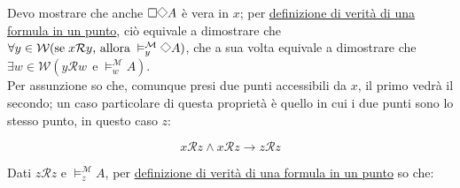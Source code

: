\documentclass[a4paper,12pt]{article}
\newcommand{\Dmd}{\mathord{\vcenter{\hbox{\tikz[baseline=-0.6ex]{\draw[line width=0.4pt, scale=1, rotate=45] (0,0) rectangle (0.2,0.2);}}}}} %
\begin{document}
\begin{dimo}
\begin{enumerate}
\begin{minipage}{0.48\textwidth}
		      \end{minipage}
		      \vspace{8pt}

		      Devo mostrare che anche $\Box \Dmd A$ è vera in $x$; per \hyperlink{defverp}{definizione di verità di una formula in un punto}, ciò equivale a dimostrare che $\forall y \in \mathcal{W} (\text{se} \; x\mathcal{R}y  \text{, allora} \; \vDash_y^{\mathcal{M}} \Dmd A)$, che a sua volta equivale a dimostrare che $\exists w \in \mathcal{W} (y\mathcal{R}w \;\, \text{e} \; \vDash_w^{\mathcal{M}} A)$.\\
		      Per assunzione so che, comunque presi due punti accessibili da $x$, il primo vedrà il secondo; un caso particolare di questa proprietà è quello in cui i due punti sono lo stesso punto, in questo caso $z$:

		      \begin{minipage}{0.48\textwidth}
			      $$x\mathcal{R}z \land x\mathcal{R}z \to z\mathcal{R}z$$
		      \end{minipage}
		      \begin{minipage}{0.48\textwidth}
			      \begin{center}
			      \end{center}
		      \end{minipage}
		      \vspace{8pt}

		      Dati $z\mathcal{R}z$ e $\vDash_z^{\mathcal{M}} A$, per \hyperlink{defverp}{definizione di verità di una formula in un punto} so che: \\


\end{enumerate}
\end{dimo}
\end{document}
